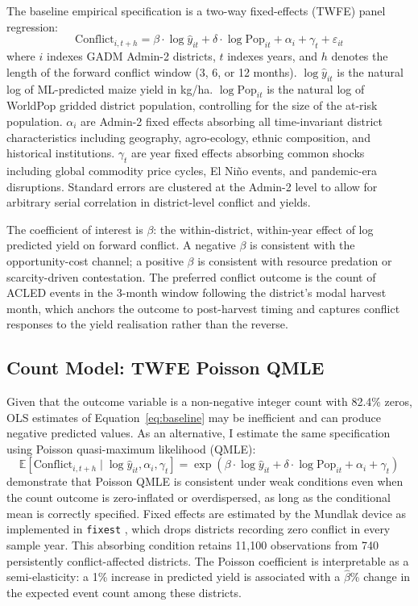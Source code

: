 The baseline empirical specification is a two-way fixed-effects (TWFE) panel regression:
\begin{equation}
  \text{Conflict}_{i,t+h} = \beta \cdot \log\hat{y}_{it} + \delta \cdot \log\text{Pop}_{it} + \alpha_i + \gamma_t + \varepsilon_{it}
  \label{eq:baseline}
\end{equation}
where $i$ indexes GADM Admin-2 districts, $t$ indexes years, and $h$ denotes the length of the forward conflict window (3, 6, or 12 months). $\log\hat{y}_{it}$ is the natural log of ML-predicted maize yield in kg/ha. $\log\text{Pop}_{it}$ is the natural log of WorldPop gridded district population, controlling for the size of the at-risk population. $\alpha_i$ are Admin-2 fixed effects absorbing all time-invariant district characteristics including geography, agro-ecology, ethnic composition, and historical institutions. $\gamma_t$ are year fixed effects absorbing common shocks including global commodity price cycles, El Ni\~no events, and pandemic-era disruptions. Standard errors are clustered at the Admin-2 level to allow for arbitrary serial correlation in district-level conflict and yields.

The coefficient of interest is $\beta$: the within-district, within-year effect of log predicted yield on forward conflict. A negative $\beta$ is consistent with the opportunity-cost channel; a positive $\beta$ is consistent with resource predation or scarcity-driven contestation. The preferred conflict outcome is the count of ACLED events in the 3-month window following the district's modal harvest month, which anchors the outcome to post-harvest timing and captures conflict responses to the yield realisation rather than the reverse.

\subsection{Count Model: TWFE Poisson QMLE}

Given that the outcome variable is a non-negative integer count with 82.4\% zeros, OLS estimates of Equation~\ref{eq:baseline} may be inefficient and can produce negative predicted values. As an alternative, I estimate the same specification using Poisson quasi-maximum likelihood (QMLE):
\begin{equation}
  \mathbb{E}[\text{Conflict}_{i,t+h} \mid \log\hat{y}_{it}, \alpha_i, \gamma_t]
  = \exp\!\left(\beta \cdot \log\hat{y}_{it} + \delta \cdot \log\text{Pop}_{it} + \alpha_i + \gamma_t\right)
  \label{eq:poisson}
\end{equation}
\citet{SantosSilvaTenreyro2006} demonstrate that Poisson QMLE is consistent under weak conditions even when the count outcome is zero-inflated or overdispersed, as long as the conditional mean is correctly specified. Fixed effects are estimated by the Mundlak device as implemented in \texttt{fixest} \citep{Berge2018}, which drops districts recording zero conflict in every sample year. This absorbing condition retains 11,100 observations from 740 persistently conflict-affected districts. The Poisson coefficient is interpretable as a semi-elasticity: a 1\% increase in predicted yield is associated with a $\hat{\beta}$\% change in the expected event count among these districts.

